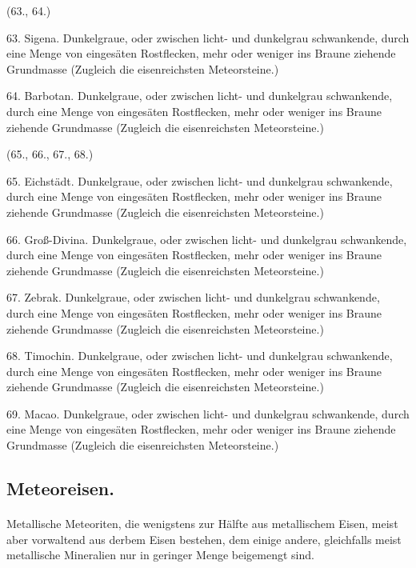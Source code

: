 \documentclass[a4paper, 11pt, oneside, polutonikogreek, german]{article}
\begin{document}
\begin{center}
(63., 64.)
\end{center}

63. Sigena. Dunkelgraue, oder zwischen licht- und dunkelgrau schwankende, durch eine Menge von eingesäten Rostflecken, mehr oder weniger ins Braune ziehende Grundmasse (Zugleich die eisenreichsten Meteorsteine.)

64. Barbotan. Dunkelgraue, oder zwischen licht- und dunkelgrau schwankende, durch eine Menge von eingesäten Rostflecken, mehr oder weniger ins Braune ziehende Grundmasse (Zugleich die eisenreichsten Meteorsteine.)

\begin{center}
(65., 66., 67., 68.)
\end{center}

65. Eichstädt. Dunkelgraue, oder zwischen licht- und dunkelgrau schwankende, durch eine Menge von eingesäten Rostflecken, mehr oder weniger ins Braune ziehende Grundmasse (Zugleich die eisenreichsten Meteorsteine.)

66. Groß-Divina. Dunkelgraue, oder zwischen licht- und dunkelgrau schwankende, durch eine Menge von eingesäten Rostflecken, mehr oder weniger ins Braune ziehende Grundmasse (Zugleich die eisenreichsten Meteorsteine.)

67. Zebrak. Dunkelgraue, oder zwischen licht- und dunkelgrau schwankende, durch eine Menge von eingesäten Rostflecken, mehr oder weniger ins Braune ziehende Grundmasse (Zugleich die eisenreichsten Meteorsteine.)

68. Timochin. Dunkelgraue, oder zwischen licht- und dunkelgrau schwankende, durch eine Menge von eingesäten Rostflecken, mehr oder weniger ins Braune ziehende Grundmasse (Zugleich die eisenreichsten Meteorsteine.)

\vspace{2ex}

69. Macao. Dunkelgraue, oder zwischen licht- und dunkelgrau schwankende, durch eine Menge von eingesäten Rostflecken, mehr oder weniger ins Braune ziehende Grundmasse (Zugleich die eisenreichsten Meteorsteine.)
\subsection{Meteoreisen.}
\paragraph{}
Metallische Meteoriten, die wenigstens zur Hälfte aus metallischem Eisen, meist aber vorwaltend aus derbem Eisen bestehen, dem einige andere, gleichfalls meist metallische Mineralien nur in geringer Menge beigemengt sind.
\end{document}
